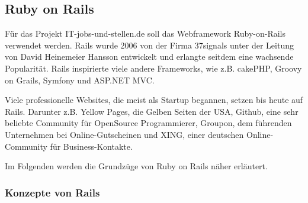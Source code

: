 
\subsection{Ruby on Rails}
\label{sec:rails}

Für das Projekt IT-jobs-und-stellen.de soll das Webframework Ruby-on-Rails verwendet werden. Rails wurde 2006 von der Firma 37signals unter der Leitung von David Heinemeier Hansson entwickelt und erlangte seitdem eine wachsende Popularität. Rails inspirierte viele andere Frameworks, wie z.B. cakePHP, Groovy on Grails, Symfony und ASP.NET MVC.

Viele professionelle Websites, die meist als Startup begannen, setzen bis heute auf Rails. Darunter z.B. Yellow Pages, die Gelben Seiten der USA, Github, eine sehr beliebte Community für OpenSource Programmierer,  Groupon, dem führenden Unternehmen bei Online-Gutscheinen und XING, einer deutschen Online-Community für Business-Kontakte.

Im Folgenden werden die Grundzüge von Ruby on Rails näher erläutert.

\subsubsection{Konzepte von Rails}

